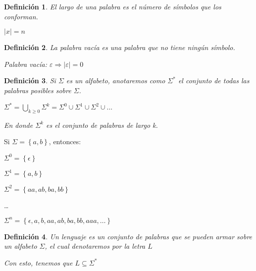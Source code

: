 \documentclass[12pt]{article}
\newtheorem{definicion}{Definición}
\begin{document}
\begin{definicion}
  El largo de una palabra es el número de símbolos que los conforman. \par \begin{center}$\left\lvert x \right\rvert  = n$\end{center}
\end{definicion}

\begin{definicion}
  La palabra vacía es una palabra que no tiene ningún símbolo.
  \begin{center}
    Palabra vacía: $\varepsilon \Rightarrow \left\lvert \varepsilon \right\rvert = 0$
  \end{center}
\end{definicion}

\begin{definicion}
  Si $\Sigma$ es un alfabeto, anotaremos como $\Sigma^*$ el conjunto de todas las palabras posibles sobre $\Sigma$.
  \begin{center}
    $\Sigma^* = \bigcup_{k\geq0} \Sigma^k = \Sigma^0 \cup \Sigma^1 \cup \Sigma^2 \cup ...$

    En donde $\Sigma^k$ es el conjunto de palabras de largo k.
  \end{center}
\end{definicion}

\begin{ejemplo}
  \begin{center}
    Si $\Sigma = \left\{a, b\right\} $, entonces: 
  
    $\Sigma^0 = \left\{\epsilon\right\}$
  
    $\Sigma^1 = \left\{a, b\right\}$
  
    $\Sigma^2 = \left\{aa, ab, ba, bb\right\}$
  
    \dots
    
    $\Sigma^n = \left\{\epsilon, a, b, aa, ab, ba, bb, aaa, \dots\right\}$
  \end{center}
\end{ejemplo}

\begin{definicion}
  Un lenguaje es un conjunto de palabras que se pueden armar sobre un alfabeto $\Sigma$, el cual denotaremos por la letra $L$

  \begin{center}
    Con esto, tenemos que $L\subseteq \Sigma^*$
  \end{center}
\end{definicion}
\end{document}
